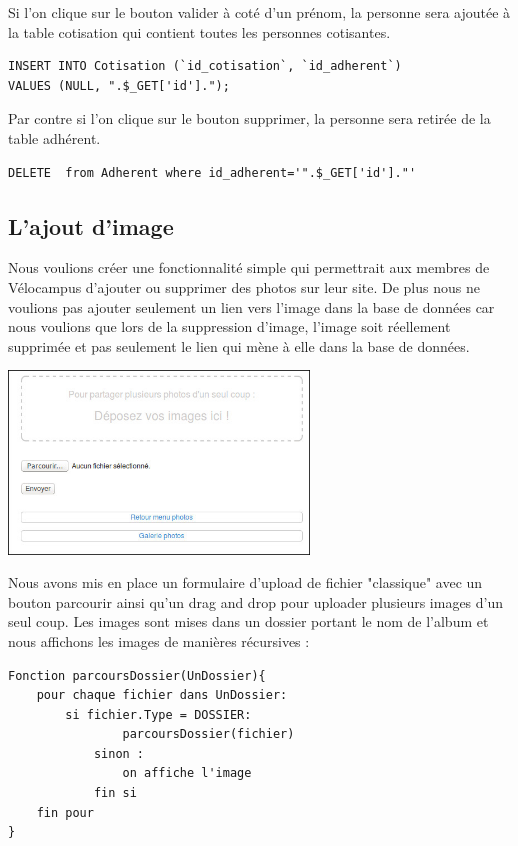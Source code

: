\documentclass[11pt,a4paper,titlepage]{report}
\begin{document}
Si l'on clique sur le bouton valider à coté d'un prénom, la personne sera ajoutée à la table cotisation qui contient toutes les personnes cotisantes.
\begin{verbatim}
INSERT INTO Cotisation (`id_cotisation`, `id_adherent`)
VALUES (NULL, ".$_GET['id'].");
\end{verbatim} 
Par contre si l'on clique sur le bouton supprimer, la personne sera retirée de la table adhérent.
\begin{verbatim}
DELETE  from Adherent where id_adherent='".$_GET['id']."'
\end{verbatim}

\subsection{L'ajout d'image}
Nous voulions créer une fonctionnalité simple qui permettrait aux membres de Vélocampus d'ajouter ou supprimer des photos sur leur site. De plus nous ne voulions pas ajouter seulement un lien vers l'image dans la base de données car nous voulions que lors de la suppression d'image, l'image soit réellement supprimée et pas seulement le lien qui mène à elle dans la base de données.
\begin{center}
\includegraphics[width=0.6\textwidth]{addImage.jpg}~
\end{center}

Nous avons mis en place un formulaire d'upload de fichier "classique" avec un bouton parcourir ainsi qu'un drag and drop pour uploader plusieurs images d'un seul coup.
Les images sont mises dans un dossier portant le nom de l'album et nous affichons les images de manières récursives :
\begin{verbatim}
Fonction parcoursDossier(UnDossier){
    pour chaque fichier dans UnDossier:
        si fichier.Type = DOSSIER:
        	    parcoursDossier(fichier)
        	sinon : 
        	    on affiche l'image
        	fin si
    fin pour
}
\end{verbatim}
\pagebreak
\end{document}
